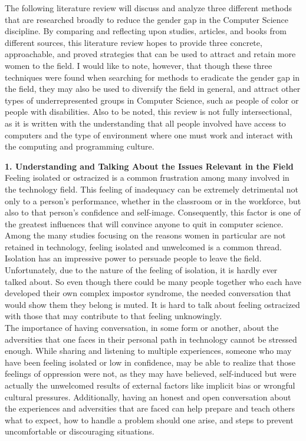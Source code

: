 \documentclass[12pt]{article}
\begin{document}
	The following literature review will discuss and analyze three different methods that are researched broadly to reduce the gender gap in the Computer Science discipline. By comparing and reflecting upon studies, articles, and books from different sources, this literature review hopes to provide three concrete, approachable, and proved strategies that can be used to attract and retain more women to the field. I would like to note, however, that though these three techniques were found when searching for methods to eradicate the gender gap in the field, they may also be used to diversify the field in general, and attract other types of underrepresented groups in Computer Science, such as people of color or people with disabilities. Also to be noted, this review is not fully intersectional, as it is written with the understanding that all people involved have access to computers and the type of environment where one must work and interact with the computing and programming culture.\\
	
	
	\pagebreak
	
	\textbf{1. Understanding and Talking About the Issues Relevant in the Field}\\
		
		Feeling isolated or ostracized is a common frustration among many involved in the technology field. This feeling of inadequacy can be extremely detrimental not only to a person's performance, whether in the classroom or in the workforce, but also to that person's confidence and self-image. Consequently, this factor is one of the greatest influences that will convince anyone to quit in computer science. Among the many studies focusing on the reasons women in particular are not retained in technology, feeling isolated and unwelcomed is a common thread. Isolation has an impressive power to persuade people to leave the field. \\
		
		Unfortunately, due to the nature of the feeling of isolation, it is hardly ever talked about. So even though there could be many people together who each have developed their own complex impostor syndrome, the needed conversation that would show them they belong is muted. It is hard to talk about feeling ostracized with those that may contribute to that feeling unknowingly. \\
		
		The importance of having conversation, in some form or another, about the adversities that one faces in their personal path in technology cannot be stressed enough. While sharing and listening to multiple experiences, someone who may have been feeling isolated or low in confidence, may be able to realize that those feelings of oppression were not, as they may have believed, self-induced but were actually the unwelcomed results of external factors like implicit bias or wrongful cultural pressures. Additionally, having an honest and open conversation about the experiences and adversities that are faced can help prepare and teach others what to expect, how to handle a problem should one arise, and steps to prevent uncomfortable or discouraging situations. \\
		
\end{document}
